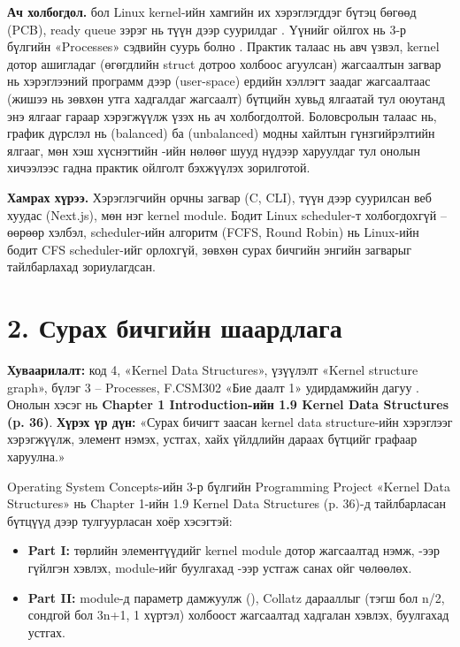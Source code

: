 \textbf{Ач холбогдол.}  бол Linux kernel-ийн хамгийн их хэрэглэгддэг бүтэц бөгөөд  (PCB), ready queue зэрэг нь түүн дээр суурилдаг . Үүнийг ойлгох нь 3-р бүлгийн «Processes» сэдвийн суурь болно . Практик талаас нь авч үзвэл, kernel дотор ашигладаг  (өгөгдлийн struct дотроо холбоос агуулсан) жагсаалтын загвар нь хэрэглээний программ дээр (user-space) ердийн хэллэгт заадаг жагсаалтаас (жишээ нь зөвхөн утга хадгалдаг жагсаалт) бүтцийн хувьд ялгаатай тул оюутанд энэ ялгааг гараар хэрэгжүүлж үзэх нь ач холбогдолтой. Боловсролын талаас нь, график дүрслэл нь  (balanced) ба  (unbalanced) модны хайлтын гүнзгийрэлтийн ялгааг, мөн хэш хүснэгтийн -ийн нөлөөг шууд нүдээр харуулдаг тул онолын хичээлээс гадна практик ойлголт бэхжүүлэх зорилготой.

\textbf{Хамрах хүрээ.} Хэрэглэгчийн орчны загвар (C, CLI), түүн дээр суурилсан веб хуудас (Next.js), мөн нэг kernel module. Бодит Linux scheduler-т холбогдохгүй -- өөрөөр хэлбэл, scheduler-ийн алгоритм (FCFS, Round Robin) нь Linux-ийн бодит CFS scheduler-ийг орлохгүй, зөвхөн сурах бичгийн энгийн загварыг тайлбарлахад зориулагдсан.

\section*{2. Сурах бичгийн шаардлага}

\textbf{Хуваарилалт:} код 4, «Kernel Data Structures», үзүүлэлт «Kernel structure graph», бүлэг 3 -- Processes, F.CSM302 «Бие даалт 1» удирдамжийн дагуу . Онолын хэсэг нь \textbf{Chapter 1 Introduction-ийн 1.9 Kernel Data Structures (p. 36)}. \textbf{Хүрэх үр дүн:} «Сурах бичигт заасан kernel data structure-ийн хэрэглээг хэрэгжүүлж, элемент нэмэх, устгах, хайх үйлдлийн дараах бүтцийг графаар харуулна.»

Operating System Concepts-ийн 3-р бүлгийн Programming Project «Kernel Data Structures» нь Chapter 1-ийн 1.9 Kernel Data Structures (p. 36)-д тайлбарласан бүтцүүд дээр тулгуурласан хоёр хэсэгтэй:

\begin{itemize}[leftmargin=20pt,itemsep=2pt,topsep=2pt]
  \item \textbf{Part I:}  төрлийн элементүүдийг kernel module дотор жагсаалтад нэмж, -ээр гүйлгэн хэвлэх, module-ийг буулгахад -ээр устгаж санах ойг чөлөөлөх.
  \item \textbf{Part II:} module-д  параметр дамжуулж (), Collatz дарааллыг (тэгш бол n/2, сондгой бол 3n+1, 1 хүртэл) холбоост жагсаалтад хадгалан хэвлэх, буулгахад устгах.
\end{itemize}

